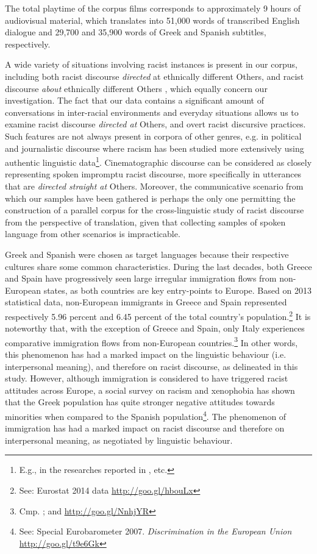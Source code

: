 \documentclass[output=paper]{LSP/langsci}
\begin{document}
The total playtime of the corpus films corresponds to approximately 9 hours of audiovisual material, which translates into 51,000 words of transcribed English dialogue and 29,700 and 35,900 words of Greek and Spanish subtitles, respectively.

A wide variety of situations involving racist instances is present in our corpus, including both racist discourse \textit{directed} at ethnically different Others, and racist discourse \textit{about} ethnically different Others \citep[351]{Dijk2004}, which equally concern our investigation. The fact that our data contains a significant amount of conversations in inter-racial environments and everyday situations allows us to examine racist discourse \textit{directed at} Others, and overt racist discursive practices. Such features are not always present in corpora of other genres, e.g. in political and journalistic discourse where racism has been studied more extensively using authentic linguistic data\footnote{E.g., in the researches reported in \citet{BakerGabrielatos2008,Dijk1993}, etc.}. Cinematographic discourse can be considered as closely representing spoken impromptu racist discourse, more specifically in utterances that are \textit{directed straight at} Others. Moreover, the communicative scenario from which our samples have been gathered is perhaps the only one permitting the construction of a parallel corpus for the cross-linguistic study of racist discourse from the perspective of translation, given that collecting samples of spoken language from other scenarios is impracticable.

Greek and Spanish were chosen as target languages because their respective cultures share some common characteristics. During the last decades, both Greece and Spain have progressively seen large irregular immigration flows from non-European states, as both countries are key entry-points to Europe. Based on 2013 statistical data, non-European immigrants in Greece and Spain represented respectively 5.96 percent and 6.45 percent of the total country's population.\footnote{See: Eurostat 2014 data \url{http://goo.gl/hbouLx}} It is noteworthy that, with the exception of Greece and Spain, only Italy experiences comparative immigration flows from non-European countries.\footnote{Cmp. \citet[4]{Vasileva2011}; and \url{http://goo.gl/NnhjYR}} In other words, this phenomenon has had a marked impact on the linguistic behaviour (i.e. interpersonal meaning), and therefore on racist discourse, as delineated in this study. However, although immigration is considered to have triggered racist attitudes across Europe, a social survey on racism and xenophobia has shown that the Greek population has quite stronger negative attitudes towards minorities when compared to the Spanish population\footnote{See: Special Eurobarometer 2007. \textit{Discrimination in the European Union} \url{http://goo.gl/t9e6Gk}}. The phenomenon of immigration has had a marked impact on racist discourse and therefore on interpersonal meaning, as negotiated by linguistic behaviour.
\end{document}
